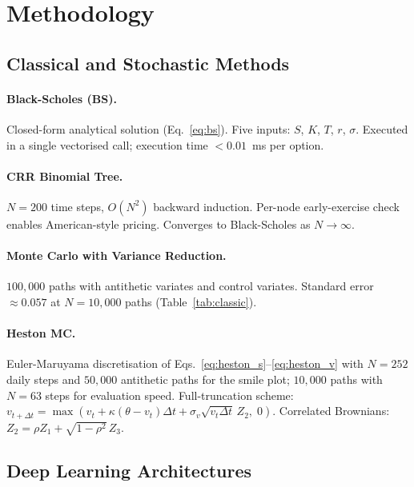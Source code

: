\documentclass[12pt,a4paper]{article}
\begin{document}
\section{Methodology}
\label{sec:methodology}

\subsection{Classical and Stochastic Methods}

\paragraph{Black-Scholes (BS).}
Closed-form analytical solution (Eq.~\ref{eq:bs}).
Five inputs: $S$, $K$, $T$, $r$, $\sigma$.
Executed in a single vectorised call; execution time $< 0.01$~ms per option.

\paragraph{CRR Binomial Tree.}
$N=200$ time steps, $O(N^2)$ backward induction.
Per-node early-exercise check enables American-style pricing.
Converges to Black-Scholes as $N\to\infty$.

\paragraph{Monte Carlo with Variance Reduction.}
$100{,}000$ paths with antithetic variates and control variates.
Standard error $\approx 0.057$ at $N=10{,}000$ paths (Table~\ref{tab:classic}).

\paragraph{Heston MC.}
Euler-Maruyama discretisation of Eqs.~\eqref{eq:heston_s}--\eqref{eq:heston_v}
with $N=252$ daily steps and $50{,}000$ antithetic paths for the smile plot;
$10{,}000$ paths with $N=63$ steps for evaluation speed.
Full-truncation scheme: $v_{t+\Delta t} = \max(v_t + \kappa(\theta-v_t)\Delta t
+ \sigma_v\sqrt{v_t\Delta t}\,Z_2,\;0)$.
Correlated Brownians: $Z_2 = \rho Z_1 + \sqrt{1-\rho^2}\,Z_3$.

\subsection{Deep Learning Architectures}
\end{document}
